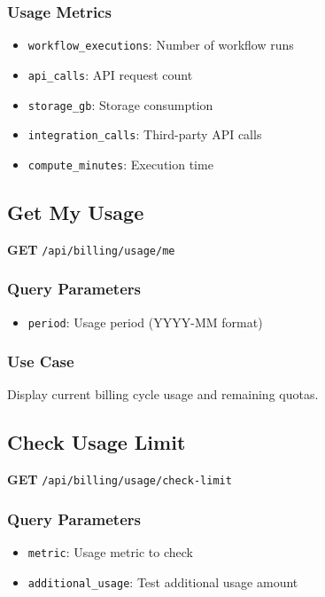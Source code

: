 \documentclass[11pt,a4paper]{report}
\begin{document}
\subsubsection{Usage Metrics}
\begin{itemize}[leftmargin=*]
    \item \texttt{workflow\_executions}: Number of workflow runs
    \item \texttt{api\_calls}: API request count
    \item \texttt{storage\_gb}: Storage consumption
    \item \texttt{integration\_calls}: Third-party API calls
    \item \texttt{compute\_minutes}: Execution time
\end{itemize}

\subsection{Get My Usage}

\textbf{GET} \texttt{/api/billing/usage/me}

\subsubsection{Query Parameters}
\begin{itemize}[leftmargin=*]
    \item \texttt{period}: Usage period (YYYY-MM format)
\end{itemize}

\subsubsection{Use Case}
Display current billing cycle usage and remaining quotas.

\subsection{Check Usage Limit}

\textbf{GET} \texttt{/api/billing/usage/check-limit}

\subsubsection{Query Parameters}
\begin{itemize}[leftmargin=*]
    \item \texttt{metric}: Usage metric to check
    \item \texttt{additional\_usage}: Test additional usage amount
\end{itemize}
\end{document}
